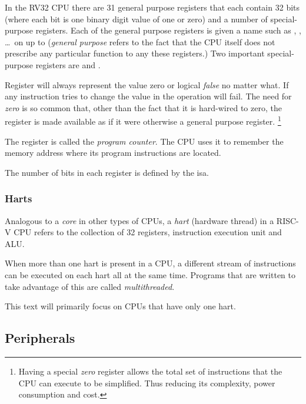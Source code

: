 In the RV32 CPU there are 31 general purpose registers that each contain 32 \gls{bit}s 
(where each bit is one \gls{binary} digit value of one or zero) and a number 
of special-purpose registers.
Each of the general purpose registers is given a name such as , ,
\ldots\ on up to  ({\em general purpose} refers to the fact that the CPU 
itself does not prescribe any particular function to any these registers.)
Two important special-purpose registers are  and .

Register  will always represent the value zero or logical {\em false}  
no matter what.  If any instruction tries to change the value in  the 
operation will fail.  The need for {\em zero} is so common that, other than the 
fact that it is hard-wired to zero, the  register is made available as 
if it were otherwise a general purpose register.%
\footnote{Having a special 
{\em zero} register allows the total set of instructions that the CPU can execute 
to be simplified.  Thus reducing its complexity, power consumption and cost.} 

The  register is called the {\em program counter}.  The CPU uses it to
remember the memory address where its program instructions are located.

%
The number of bits in each register is defined by the \acrfull{isa}.

\subsubsection{Harts}

Analogous to a {\em core} in other types of CPUs, a {\em \acrshort{hart}} 
(hardware \gls{thread}) in a RISC-V CPU refers to the collection of 32 registers,
instruction execution unit and ALU.

When more than one hart is present in a CPU, a different stream of instructions can 
be executed on each hart all at the same time.
Programs that are written to take advantage of this are called {\em multithreaded}.

This text will primarily focus on CPUs that have only one hart.

\subsection{Peripherals}

